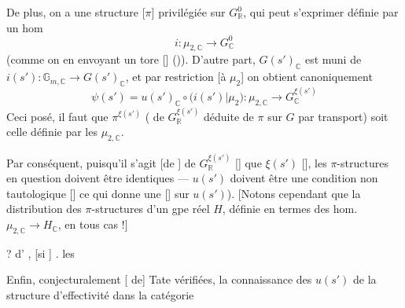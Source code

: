 
De plus, on a une structure [$\pi$] privilégiée sur $G^{0}_{\mathbb{R}}$,
qui peut  s'exprimer définie par un hom
\struck{\ill{}}
\[
  i : \mu_{2,\mathbb{C}} \longrightarrow G^{0}_{\mathbb{C}}
\]
(comme on \ill{} en envoyant un tore [\ill{}] (\ill{})). D'autre part,
$G(s')_{\mathbb{C}}$ est muni de $i(s') : \mathbb{G}_{m,\mathbb{C}} \to
G(s')_{\mathbb{C}}$, et par restriction [à $\mu_2$] on obtient
canoniquement
\[
  \psi(s') = u(s')_{\mathbb{C}} \circ \bigl(i(s') \vert \mu_2\bigr) :
  \mu_{2,\mathbb{C}} \longrightarrow G_{\mathbb{C}}^{\xi(s')}
\]
 Ceci posé, il faut que $\pi^{\xi(s')}$ (\ill{} de
$G_{\mathbb{R}}^{\xi(s')}$ déduite de $\pi$ sur $G$ par transport) soit
celle définie par les $\mu_{2,\mathbb{C}}$.

Par conséquent, puisqu'il s'agit [de \ill{}] de $G_{\mathbb{R}}^{\xi(s')}$
[\ill{}] que $\xi(s')$ \ill{} [], les
$\pi$-structures en question doivent être identiques --- \ill{} $u(s')$
doivent être une condition non tautologique [\ill{}] ce qui donne une
[] sur $u(s')$). [Notons cependant que la
distribution des $\pi$-structures d'un gpe réel $H$, définie en termes des
hom.\ $\mu_{2,\mathbb{C}} \to H_{\mathbb{C}}$, \ill{} \ill{}
 en tous cas !]

? d' \ill{} , [si \ill{}] \ill{}
\ill{} \ill{} . \ill{} les 
\ill{} \ill{}

Enfin, conjecturalement \ill{} [ de]
Tate vérifiées, la connaissance des $u(s')$ \struck{\ill{}} \ill{} de la
structure d'effectivité dans la catégorie

